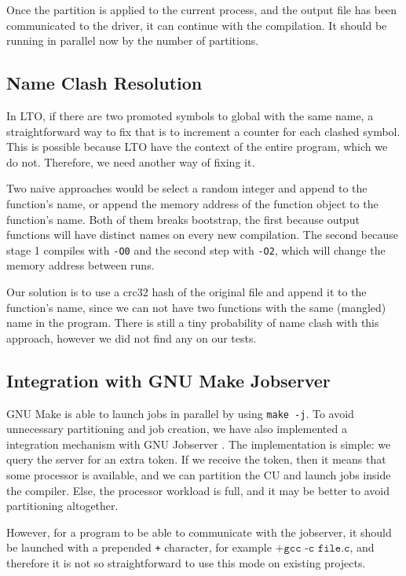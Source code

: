 \documentclass[runningheads]{llncs}
\begin{document}
Once the partition is applied to the current process, and the output file has
been communicated to the driver, it can continue with the compilation. It
should be running in parallel now by the number of partitions.

\subsection{Name Clash Resolution}\label{sec:name_clash_resolution}

In LTO, if there are two promoted symbols to global with the same name, a
straightforward way to fix that is to increment a counter for each clashed
symbol. This is possible because LTO have the context of the entire program,
which we do not. Therefore, we need another way of fixing it.

Two naive approaches would be select a random integer and append to the function's name,
or append the memory address of the function object to the function's name.
Both of them breaks bootstrap, the first because output functions will have
distinct names on every new compilation. The second because stage 1
compiles with \texttt{-O0} and the second step with \texttt{-O2}, which will
change the memory address between runs.

Our solution is to use a crc32 hash of the original file and append it to the
function's name, since we can not have two functions with the same (mangled)
name in the program.  There is still a tiny probability of name clash with this
approach, however we did not find any on our tests.

\subsection{Integration with GNU Make Jobserver}\label{sec:integration_jobserver}

GNU Make is able to launch jobs in parallel by using \texttt{make -j}.
To avoid unnecessary partitioning and job creation, we have also
implemented a integration mechanism with GNU Jobserver \cite{posixjobserver}.
The implementation
is simple: we query the server for an extra token. If we receive the token,
then it means that some processor is available, and we can partition the
CU and launch jobs inside the compiler. Else, the processor
workload is full, and it may be better to avoid partitioning altogether.

However, for a program to be able to communicate with the jobserver,
it should be launched with a prepended \texttt{+} character,
for example $\texttt{+gcc -c file.c}$, and therefore it is not
so straightforward to use this mode on existing projects.
\end{document}
